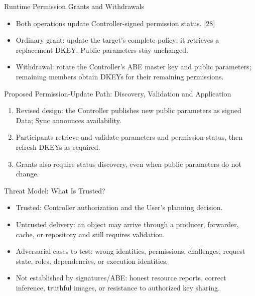 \begin{frame}{Runtime Permission Grants and Withdrawals}
\begin{itemize}
\item Both operations update Controller-signed permission status. [28]
\item Ordinary grant: update the target's complete policy; it retrieves a replacement DKEY. Public parameters stay unchanged.
\item Withdrawal: rotate the Controller's ABE master key and public parameters; remaining members obtain DKEYs for their remaining permissions.
\end{itemize}
\vspace{3mm}
\end{frame}

\begin{frame}{Proposed Permission-Update Path: Discovery, Validation and Application}
\begin{enumerate}
\item Revised design: the Controller publishes new public parameters as signed Data; Sync announces availability.
\item Participants retrieve and validate parameters and permission status, then refresh DKEYs as required.
\item Grants also require status discovery, even when public parameters do not change.
\end{enumerate}
\vspace{2mm}
\end{frame}

\begin{frame}{Threat Model: What Is Trusted?}
\begin{itemize}
\item Trusted: Controller authorization and the User's planning decision.
\item Untrusted delivery: an object may arrive through a producer, forwarder, cache, or repository and still requires validation.
\item Adversarial cases to test: wrong identities, permissions, challenges, request state, roles, dependencies, or execution identities.
\item Not established by signatures/ABE: honest resource reports, correct inference, truthful images, or resistance to authorized key sharing.
\end{itemize}
\end{frame}

